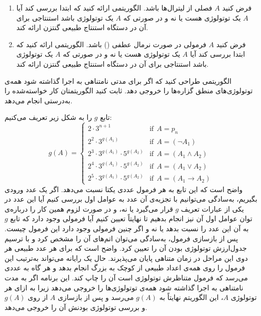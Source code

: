\begin{enumerate}
  \item
  فرض کنید $A$ فصلی از لیترال‌ها باشد. الگوریتمی ارائه کنید که ابتدا بررسی کند آیا $A$ یک توتولوژی هست یا نه و در صورتی که $A$ یک توتولوژی باشد استنتاجی برای آن در دستگاه استنتاج طبیعی گنتزن ارائه کند.
  \item
  فرض کنید $A$ فرمولی در صورت نرمال عطفی () باشد. الگوریتمی ارائه کنید که ابتدا بررسی کند آیا $A$ یک توتولوژی هست یا نه و در صورتی که $A$ یک توتولوژی باشد استنتاجی برای آن در دستگاه استنتاج طبیعی گنتزن ارائه کند.
  \end{enumerate}
  
  \item
  الگوریتمی طراحی کنید که اگر برای مدتی نامتناهی به اجرا گذاشته شود همه‌ی توتولوژی‌های منطق گزاره‌ها را خروجی دهد. ثابت کنید الگوریتمتان کار خواسته‌شده را به‌درستی انجام می‌دهد.
  \begin{ans}
  تابع $g$ را به شکل زیر تعریف می‌کنیم:
  $$
  g(A)=
  \begin{cases}
  2\cdot 3^{n+1} & \text{if}~~A = p_n\\
  2^2\cdot 3^{g(A_1)} & \text{if}~~A=(\neg A_1)\\
  2^3\cdot 3^{g(A_1)}\cdot 5^{g(A_2)} & \text{if}~~A=(A_1\wedge A_2) \\
  2^4\cdot 3^{g(A_1)}\cdot 5^{g(A_2)} & \text{if}~~A=(A_1\vee A_2) \\
  2^5\cdot 3^{g(A_1)}\cdot 5^{g(A_2)} & \text{if}~~A=(A_1\rightarrow A_2)
  \end{cases}
  $$
  واضح است که این تابع به هر فرمول عددی یکتا نسبت می‌دهد. اگر یک عدد ورودی بگیریم، به‌سادگی می‌توانیم با تجزیه‌ی آن عدد به عوامل اول بررسی کنیم آیا این عدد در یکی از عبارات تعریف $g$ قرار می‌گیرد یا نه، و در صورت لزوم همین کار را درباره‌ی توان عوامل اول آن نیز انجام بدهیم تا نهایتاً تعیین کنیم آیا فرمولی وجود دارد که تابع $g$ به آن این عدد را نسبت بدهد یا نه و اگر چنین فرمولی وجود دارد این فرمول چیست. پس از بازسازی فرمول، به‌سادگی می‌توان اتم‌های آن را مشخص کرد و با ترسیم جدول‌ارزش توتولوژی بودن آن را تعیین کرد. واضح است که برای هر عدد طبیعی هر دوی این مراحل در زمان متناهی پایان می‌پذیرند. حال یک رایانه می‌تواند به‌ترتیب این فرمول را روی همه‌ی اعداد طبیعی از کوچک به بزرگ انجام بدهد و هر گاه به عددی می‌رسد که فرمول متناظرش توتولوژی است آن را چاپ کند. این برنامه اگر به مدت نامتناهی به اجرا گذاشته شود همه‌ی توتولوژی‌ها را خروجی می‌دهد زیرا به ازای هر توتولوژی $A$، این الگوریتم نهایتاً به
  $g(A)$
  می‌رسد و پس از بازسازی $A$ از روی $g(A)$ و بررسی توتولوژی بودنش آن را خروجی می‌دهد.
  \end{ans}
  